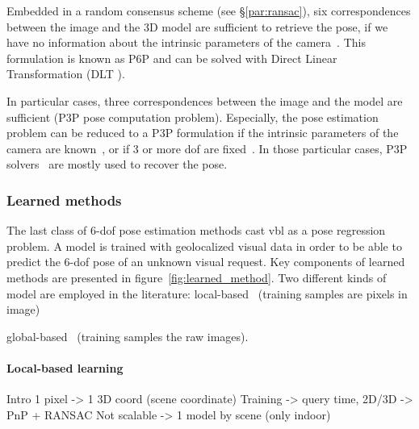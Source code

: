 Embedded in a random consensus scheme (see \S\ref{par:ransac}), six correspondences between the image and the 3D model are sufficient to retrieve the pose, if we have no information about the intrinsic parameters of the camera~\citep{Donoser2014,Li2010,Li2010,Heisterklaus2014}. This formulation is known as P6P and can be solved with Direct Linear Transformation (DLT \citep{Hartley2003}).

In particular cases, three correspondences between the image and the model are sufficient (P3P pose computation problem). Especially, the pose estimation problem can be reduced to a P3P formulation if the intrinsic parameters of the camera are known~\citep{Irschara2009,Middelberg2014}, or if 3 or more \ac{dof} are fixed~\citep{Zeisl2015,Qu2016,Svarm2016,Svarm2014}. In those particular cases, P3P solvers~\citet{Kneip2011} are mostly used to recover the pose.

\subsubsection{Learned methods}


\label{subsubsec:pose_regression}
The last class of 6-\ac{dof} pose estimation methods cast \ac{vbl} as a pose regression problem. A model is trained with geolocalized visual data in order to be able to predict the 6-\ac{dof} pose of an unknown visual request. Key components of learned methods are presented in figure~\ref{fig:learned_method}. Two different kinds of model are employed in the literature: 
local-based~\citep{Shotton2013} (\eg training samples are pixels in image)

global-based~\citep{Kendall2015} (\eg training samples the raw images).

\paragraph{Local-based learning}
Intro 1 pixel -> 1 3D coord (scene coordinate) 
Training -> query time, 2D/3D -> PnP + RANSAC
Not scalable -> 1 model by scene (only indoor)

